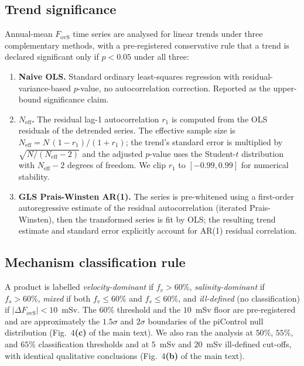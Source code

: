 \documentclass[11pt,a4paper]{article}
\newcommand{\Fovs}{F_\mathrm{ovS}}
\begin{document}
\subsection*{Trend significance}

Annual-mean $\Fovs$ time series are analysed for linear trends under three complementary methods, with a pre‑registered conservative rule that a trend is declared significant only if $p<0.05$ under all three:

\begin{enumerate}
\item \textbf{Naive OLS.} Standard ordinary least-squares regression with residual-variance-based $p$-value, no autocorrelation correction. Reported as the upper-bound significance claim.
\item \textbf{\citet{Santer2000} $N_\mathrm{eff}$.} The residual lag-1 autocorrelation $r_1$ is computed from the OLS residuals of the detrended series. The effective sample size is $N_\mathrm{eff} = N\,(1-r_1)/(1+r_1)$; the trend's standard error is multiplied by $\sqrt{N/(N_\mathrm{eff}-2)}$ and the adjusted $p$-value uses the Student-$t$ distribution with $N_\mathrm{eff}-2$ degrees of freedom. We clip $r_1$ to $[-0.99,0.99]$ for numerical stability.
\item \textbf{GLS Prais-Winsten AR(1).} The series is pre-whitened using a first-order autoregressive estimate of the residual autocorrelation (iterated Prais-Winsten), then the transformed series is fit by OLS; the resulting trend estimate and standard error explicitly account for AR(1) residual correlation.
\end{enumerate}

\subsection*{Mechanism classification rule}

A product is labelled \emph{velocity-dominant} if $f_v > 60\%$, \emph{salinity-dominant} if $f_s > 60\%$, \emph{mixed} if both $f_v \le 60\%$ and $f_s \le 60\%$, and \emph{ill-defined} (no classification) if $|\Delta\Fovs| < 10$~mSv. The $60\%$ threshold and the $10$~mSv floor are pre‑registered and are approximately the $1.5\sigma$ and $2\sigma$ boundaries of the piControl null distribution (Fig.~4\textbf{(c)} of the main text). We also ran the analysis at $50\%$, $55\%$, and $65\%$ classification thresholds and at $5$~mSv and $20$~mSv ill-defined cut-offs, with identical qualitative conclusions (Fig.~4\textbf{(b)} of the main text).
\end{document}
